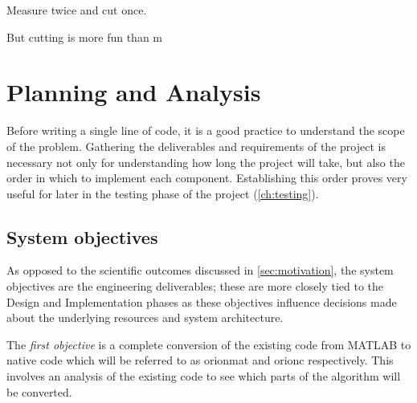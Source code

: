\begin{savequote}[0.55\linewidth]
	\begin{fancyquote}
		Measure twice and cut once.
	\end{fancyquote}

	\begin{fancyquote}
		But cut\hspace{1em}ting is more fun than m\hspace{0.5em}\raisebox{-0.1em}{eas}\hspace{0.5em}\raisebox{-0.3em}{uri}\hspace{0.5em}\raisebox{-0.5em}{ng!}
	\end{fancyquote}
\end{savequote}

\chapter{Planning and Analysis}\label{ch:analysis}

Before writing a single line of code, it is a good practice to understand the
scope of the problem. Gathering the deliverables and requirements of the
project is necessary not only for understanding how long the project will take,
but also the order in which to implement each component. Establishing this
order proves very useful for later in the testing phase of the project
(\cref{ch:testing}).

\section{System objectives}\label{sec:objectives}

As opposed to the scientific outcomes discussed in \cref{sec:motivation},
the system objectives are the engineering
deliverables; these are more closely tied to the Design and Implementation
phases as these objectives influence decisions made about the underlying
resources and system architecture.

The \emph{first objective} is a complete conversion of the
existing code from MATLAB to native code which will be referred to
as \gls{orionmat} and \gls{orionc} respectively. This involves an
analysis of the existing code to see which parts of the algorithm will be converted.

